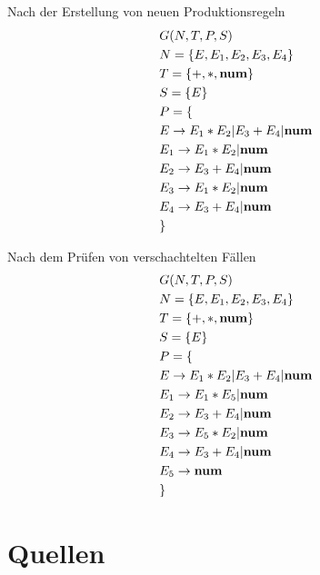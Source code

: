 \documentclass[t]{beamer}
\begin{document}
	\begin{frame}
		\centering
		\begin{minipage}[c]{0.4\textwidth}
			\vspace{-2em}
			\begin{block}{Nach der Erstellung von neuen Produktionsregeln}
				\vspace{-2em}
				\begin{align*}
					& G(N,T,P,S) \\
					& N= \{E, E_1, E_2, E_3, E_4\} \\
					& T= \{+, *, \bold{num}\} \\
					& S= \{E\} \\
					& P = \{ \\
					& E     \rightarrow E_1 * E_2 | E_3 + E_4 | \bold{num} \\
					& E_1   \rightarrow E_1 * E_2 | \bold{num} \\
					& E_2   \rightarrow E_3 + E_4 | \bold{num} \\
					& E_3   \rightarrow E_1 * E_2 | \bold{num} \\
					& E_4   \rightarrow E_3 + E_4 | \bold{num} \\
					& \}
				\end{align*}
			\end{block}
		\end{minipage}%
		\quad%
		\quad%
		\begin{minipage}[c]{0.4\textwidth}
			\vspace{-1em}
			\begin{block}{Nach dem Prüfen von verschachtelten Fällen}
				\vspace{-2em}
				\begin{align*}
					& G(N,T,P,S) \\
					& N= \{E, E_1, E_2, E_3, E_4\} \\
					& T= \{+, *, \bold{num}\} \\
					& S= \{E\} \\
					& P = \{ \\
					& E     \rightarrow E_1 * E_2 | E_3 + E_4 | \bold{num} \\
					& E_1   \rightarrow E_1 * E_5 | \bold{num} \\
					& E_2   \rightarrow E_3 + E_4 | \bold{num} \\
					& E_3   \rightarrow E_5 * E_2 | \bold{num} \\
					& E_4   \rightarrow E_3 + E_4 | \bold{num} \\
					& E_5   \rightarrow \bold{num} \\
					& \}
				\end{align*}
			\end{block}
		\end{minipage}
	\end{frame}


	\section{Quellen}
	\begin{frame}[allowframebreaks]
		
		
	\end{frame}
\end{document}
